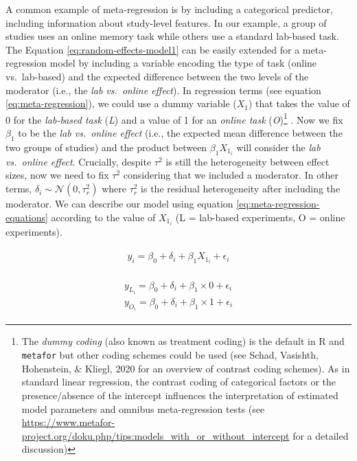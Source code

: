 \documentclass[
  man,floatsintext]{apa6}
\begin{document}
A common example of meta-regression is by including a categorical predictor, including information about study-level features. In our example, a group of studies uses an online memory task while others use a standard lab-based task. The Equation \eqref{eq:random-effects-model1} can be easily extended for a meta-regression model by including a variable encoding the type of task (online vs.~lab-based) and the expected difference between the two levels of the moderator (i.e., the \emph{lab vs.~online effect}). In regression terms (see equation \eqref{eq:meta-regression}), we could use a dummy variable (\(X_{1}\)) that takes the value of 0 for the \emph{lab-based task} (\emph{L}) and a value of 1 for an \emph{online task} (\emph{O})\footnote{The \emph{dummy coding} (also known as treatment coding) is the default in R and \texttt{metafor} but other coding schemes could be used (see Schad, Vasishth, Hohenstein, \& Kliegl, 2020 for an overview of contrast coding schemes). As in standard linear regression, the contrast coding of categorical factors or the presence/absence of the intercept influences the interpretation of estimated model parameters and omnibus meta-regression tests (see \url{https://www.metafor-project.org/doku.php/tips:models_with_or_without_intercept} for a detailed discussion)} . Now we fix \(\beta_{1}\) to be the \emph{lab vs.~online effect} (i.e., the expected mean difference between the two groups of studies) and the product between \(\beta_{1}X_{1_i}\) will consider the \emph{lab vs.~online effect}. Crucially, despite \(\tau^{2}\) is still the heterogeneity between effect sizes, now we need to fix \(\tau^{2}\) considering that we included a moderator. In other terms, \(\delta_i \sim \mathcal{N}(0, \tau_{r}^{2})\) where \(\tau^2_r\) is the residual heterogeneity after including the moderator. We can describe our model using equation \eqref{eq:meta-regression-equations} according to the value of \(X_{1_i}\) (L = lab-based experiments, O = online experiments).

\begin{align}
\begin{gathered}
y_i = \beta_0 + \delta_i + \beta_1 X_{1_i} + \epsilon_i
\label{eq:meta-regression}
\end{gathered}
\end{align}

\begin{align}
\begin{gathered}
y_{L_i} = \beta_0 + \delta_i + \beta_1 \times 0 + \epsilon_i \\
y_{O_i} = \beta_0 + \delta_i + \beta_1 \times 1 + \epsilon_i
\label{eq:meta-regression-equations}
\end{gathered}
\end{align}
\end{document}
